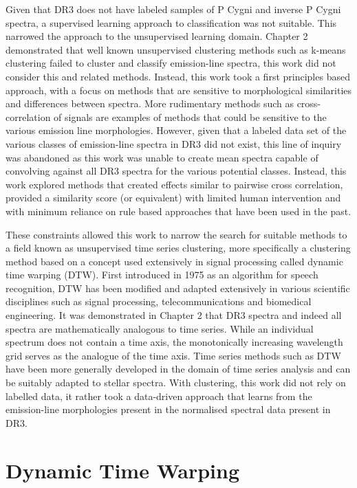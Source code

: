Given that DR3 does not have labeled samples of P Cygni and inverse P Cygni spectra, a supervised learning approach to classification was not suitable. This narrowed the approach to the unsupervised learning domain\cite{hastie2009elements}. Chapter 2 demonstrated that well known unsupervised clustering methods such as k-means clustering failed to cluster and classify emission-line spectra\cite{garcia2018machine}, this work did not consider this and related methods. Instead, this work took a first principles based approach, with a focus on methods that are sensitive to morphological similarities and differences between spectra. More rudimentary methods such as cross-correlation of signals are examples of methods that could be sensitive to the various emission line morphologies. However, given that a labeled data set of the various classes of emission-line spectra in DR3 did not exist, this line of inquiry was abandoned as this work was unable to create mean spectra capable of convolving against all DR3 spectra for the various potential classes. Instead, this work explored methods that created effects similar to pairwise cross correlation, provided a similarity score (or equivalent) with limited human intervention and with minimum reliance on rule based approaches that have been used in the past\cite{traven2015gaia}. 

These constraints allowed this work to narrow the search for suitable methods to a field known as unsupervised time series clustering, more specifically a clustering method based on a concept used extensively in signal processing called dynamic time warping (DTW)\cite{kruskal1983overview}. First introduced in 1975 as an algorithm for speech recognition\cite{itakura1975minimum}, DTW has been modified and adapted extensively in various scientific disciplines such as signal processing, telecommunications and biomedical engineering. It was demonstrated in Chapter 2 that DR3 spectra and indeed all spectra are mathematically analogous to time series. While an individual spectrum does not contain a time axis, the monotonically increasing wavelength grid serves as the analogue of the time axis. Time series methods such as DTW have been more generally developed in the domain of time series analysis\cite{nielsen2019practical} and can be suitably adapted to stellar spectra. With clustering, this work did not rely on labelled data, it rather took a data-driven approach that learns from the emission-line morphologies present in the normalised spectral data present in DR3.

\section{Dynamic Time Warping}

